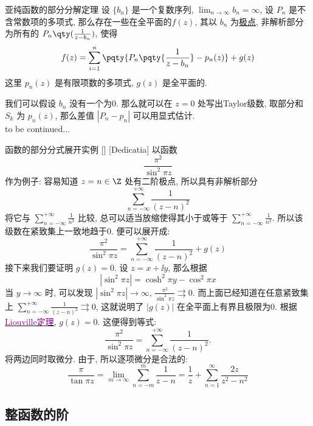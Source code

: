 \documentclass[UTF8]{ctexart}
\newcommand{\hyperrefc}[2]{\hyperref[#1]{\textcolor{purple}{#2}}}
\newcommand{\continued}{{\Large to be continued...}}
\begin{document}
        \begin{thm}
            {亚纯函数的部分分解定理}
            设 \(\{b_n\}\) 是一个复数序列,  \(\lim_{n\to\infty }b_n=\infty\), 设 \(P_n\) 是不含常数项的多项式, 那么存在一些在全平面的\MeromorphicFunction  \(f(z)\), 其以 \(b_n\) 为\hyperref[dfn:PolarSingularity]{极点}, 非解析部分为所有的 \(P_n\qty(\frac{1}{z-b_n})\), 使得
            \[f(z)=\sum_{i=1}^{n}\pqty{P_n\pqty{\frac{1}{z-b_n}}-p_n(z)}+g(z)\]
            这里 \(p_n(z)\) 是有限项数的多项式,  \(g(z)\) 是全平面的. 
        \end{thm}

        \begin{prf}
            我们可以假设 \(b_n\) 没有一个为0. 那么就可以在 \(z=0\) 处写出Taylor级数, 取部分和 \(S_k\) 为 \(p_n(z)\), 那么差值 \(|P_n-p_n|\) 可以用\TaylorThm 显式估计. \\
            \continued
        \end{prf}

        \begin{xmp}
            [64]
            {函数的部分分式展开实例}
            []
            [Dedicatia]
            以函数
            \[\frac{\pi^2}{\sin^2\pi z}\]
            作为例子: 容易知道 \(z=n\in\Z\) 处有二阶极点, 所以具有非解析部分
            \[\sum_{n=-\infty}^{+\infty}\frac{1}{(z-n)^2}\]
            将它与 \(\sum\limits_{n=-\infty}^{+\infty}\frac{1}{n^2}\) 比较, 总可以适当放缩使得其小于或等于 \(\sum\limits_{n=-\infty}^{+\infty}\frac{1}{n^2}\). 所以该级数在紧致集上一致地趋于0. 便可以展开成: 
            \[\frac{\pi^2}{\sin^2\pi z}=\sum_{n=-\infty}^{+\infty}\frac{1}{(z-n)^2}+g(z)\]
            接下来我们要证明 \(g(z)=0\). 设 \(z=x+\ii y\), 那么根据
            \[|\sin^2\pi z|=\cosh^2\pi y-\cos^2\pi x\]
            当 \(y\to\infty\) 时, 可以发现 \(|\sin^2\pi z|\to\infty\),  \(\frac{\pi^2}{\sin^2\pi z}\rightrightarrows 0\). 而上面已经知道在任意紧致集上 \(\sum_{n=-\infty}^{+\infty}\frac{1}{(z-n)^2}\rightrightarrows 0\), 这就说明了 \(|g(z)|\) 在全平面上有界且极限为0. 根据\hyperrefc{thm:Liouville}{Liouville定理},  \(g(z)=0\). 这便得到等式: 
            \[\frac{\pi^2}{\sin^2\pi z}=\sum_{n=-\infty}^{+\infty}\frac{1}{(z-n)^2}.\]
            将两边同时取微分. 由于\UniformConvergence, 所以逐项微分是合法的: 
            \[\frac{\pi}{\tan\pi z}=\lim_{m\to\infty}\sum_{n=-m}^{m}\frac{1}{z-n}=\frac{1}{z}+\sum_{n=1}^{\infty}\frac{2z}{z^2-n^2}\]
        \end{xmp}
    
    \subsection{整函数的阶}
\end{document}
